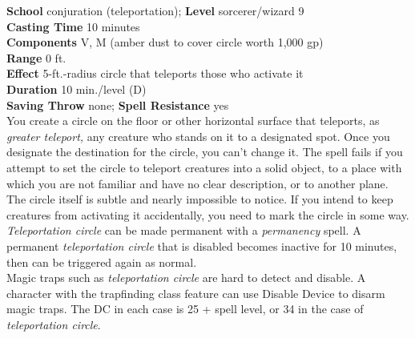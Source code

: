 \textbf{School} conjuration (teleportation); \textbf{Level} sorcerer/wizard 9\\
\textbf{Casting Time} 10 minutes\\
\textbf{Components} V, M (amber dust to cover circle worth 1,000 gp)\\
\textbf{Range} 0 ft.\\
\textbf{Effect} 5-ft.-radius circle that teleports those who activate it\\
\textbf{Duration} 10 min./level (D)\\
\textbf{Saving Throw} none; \textbf{Spell Resistance} yes\\
You create a circle on the floor or other horizontal surface that teleports, as \textit{greater teleport, }any creature who stands on it to a designated spot. Once you designate the destination for the circle, you can't change it. The spell fails if you attempt to set the circle to teleport creatures into a solid object, to a place with which you are not familiar and have no clear description, or to another plane.\\
The circle itself is subtle and nearly impossible to notice. If you intend to keep creatures from activating it accidentally, you need to mark the circle in some way.\\
\textit{Teleportation circle }can be made permanent with a \textit{permanency }spell. A permanent \textit{teleportation circle }that is disabled becomes inactive for 10 minutes, then can be triggered again as normal.\\
Magic traps such as \textit{teleportation circle }are hard to detect and disable. A character with the trapfinding class feature can use Disable Device to disarm magic traps. The DC in each case is 25 + spell level, or 34 in the case of \textit{teleportation circle}.\\
